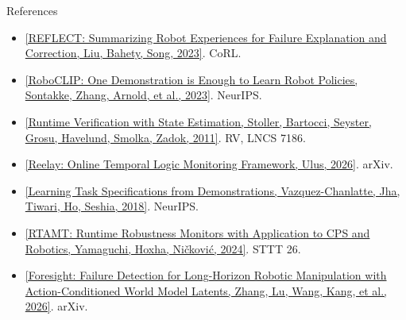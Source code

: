 \documentclass[14pt, aspectratio=169]{beamer}
\newcommand{\paper}[4]{\href{#1}{[#2, #3, #4]}}
\begin{document}
\begin{frame}[allowframebreaks]{References}
\begin{itemize}
        \item[] \paper{https://proceedings.mlr.press/v229/liu23g.html}{REFLECT: Summarizing Robot Experiences for Failure Explanation and Correction}{Liu, Bahety, Song}{2023}. CoRL.
        \item[] \paper{https://arxiv.org/abs/2310.07899}{RoboCLIP: One Demonstration is Enough to Learn Robot Policies}{Sontakke, Zhang, Arnold, et al.}{2023}. NeurIPS.
        \item[] \paper{https://doi.org/10.1007/978-3-642-29860-8_15}{Runtime Verification with State Estimation}{Stoller, Bartocci, Seyster, Grosu, Havelund, Smolka, Zadok}{2011}. RV, LNCS 7186.
        \item[] \paper{https://arxiv.org/abs/2604.22384}{Reelay: Online Temporal Logic Monitoring Framework}{Ulus}{2026}. arXiv.
        \item[] \paper{https://proceedings.neurips.cc/paper_files/paper/2018/hash/74934548253bcab8490ebd74afed7031-Abstract.html}{Learning Task Specifications from Demonstrations}{Vazquez-Chanlatte, Jha, Tiwari, Ho, Seshia}{2018}. NeurIPS.
        \item[] \paper{https://doi.org/10.1007/s10009-023-00720-3}{RTAMT: Runtime Robustness Monitors with Application to CPS and Robotics}{Yamaguchi, Hoxha, Ničković}{2024}. STTT 26.
        \item[] \paper{https://arxiv.org/abs/2606.23085}{Foresight: Failure Detection for Long-Horizon Robotic Manipulation with Action-Conditioned World Model Latents}{Zhang, Lu, Wang, Kang, et al.}{2026}. arXiv.
    \end{itemize}
\end{frame}
\end{document}
